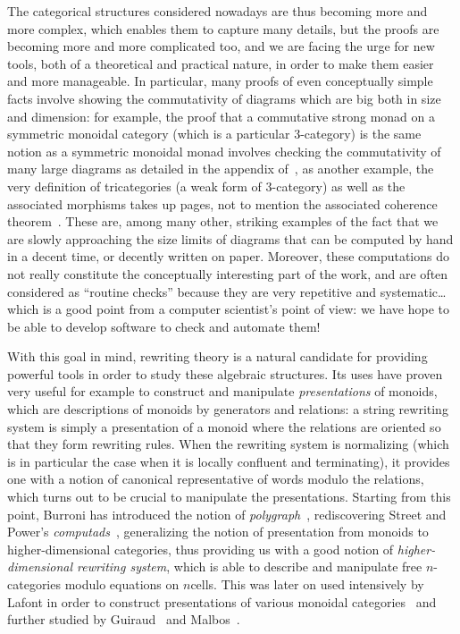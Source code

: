 \documentclass{LMCS}
\begin{document}
The categorical structures considered nowadays are thus becoming more and more
complex, which enables them to capture many details, but the proofs are becoming
more and more complicated too, and we are facing the urge for new tools, both of
a theoretical and practical nature, in order to make them easier and more
manageable. In particular, many proofs of even conceptually simple facts involve
showing the commutativity of diagrams which are big both in size and dimension:
for example, the proof that a commutative strong monad on a symmetric monoidal
category (which is a particular 3-category) is the same notion as a symmetric
monoidal monad involves checking the commutativity of many large diagrams as
detailed in the appendix of~\cite{goubault:logical-relations}, as another
example, the very definition of tricategories (a weak form of 3-category) as
well as the associated morphisms takes up pages, not to mention the associated
coherence theorem~\cite{gordon-power-street:coh-tricat, gurski:tricat}. These
are, among many other, striking examples of the fact that we are slowly
approaching the size limits of diagrams that can be computed by hand in a decent
time, or decently written on paper. Moreover, these computations do not really
constitute the conceptually interesting part of the work, and are often
considered as ``routine checks'' because they are very repetitive and
systematic\ldots which is a good point from a computer scientist's point of
view: we have hope to be able to develop software to check and automate them!

\bigskip

With this goal in mind, rewriting theory is a natural candidate for providing
powerful tools in order to study these algebraic structures. Its uses have
proven very useful for example to construct and manipulate \emph{presentations}
of monoids, which are descriptions of monoids by generators and relations: a
string rewriting system is simply a presentation of a monoid where the relations
are oriented so that they form rewriting rules. When the rewriting system is
normalizing (which is in particular the case when it is locally confluent and
terminating), it provides one with a notion of canonical representative of words
modulo the relations, which turns out to be crucial to manipulate the
presentations. Starting from this point, Burroni has introduced the notion of
\emph{polygraph}~\cite{burroni:higher-word}, rediscovering Street and Power's
\emph{computads}~\cite{street:limit-indexed-by-functors, power:n-cat-pasting},
generalizing the notion of presentation from monoids to higher-dimensional
categories, thus providing us with a good notion of \emph{higher-dimensional
  rewriting system}, which is able to describe and manipulate free
$n$-categories modulo equations on $n$\nbd{}cells. This was later on used intensively
by Lafont in order to construct presentations of various monoidal
categories~\cite{lafont:boolean-circuits} and further studied by
Guiraud~\cite{guiraud:these, guiraud:termination-3-rewr,
  guiraud:three-dimensions-proofs, guiraud:presentations-petri-nets} and
Malbos~\cite{guiraud-malbos:higher-cat-fdt}.
\end{document}
